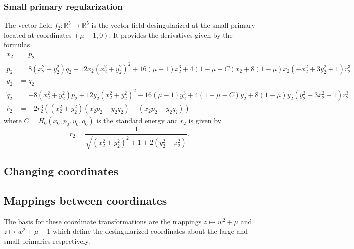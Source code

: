 \documentclass[10pt]{article}
\newcommand{\rr}{\mathbb{R}}
\begin{document}
\subsubsection{Small primary regularization}
The vector field $f_2: \rr^5 \to \rr^5$ is the vector field desingularized at the small primary located at coordinates $(\mu-1,0)$. It provides the derivatives given by the formulas
\begin{align*} 
\dot x_2 & = p_2 \\ 
\dot p_2 & = 8 \left( x_2^2 + y_2^2 \right) q_2 + 12 x_2 \left( x_2^2 + y_2^2  \right)^2 + 16(\mu-1) x_2^3 + 4 ( 1-\mu - C) x_2 + 8 ( 1 - \mu ) x_2 \left( - x_2^2+ 3y_2^2 + 1 \right) r_2^3 \\
\dot y_2 & = q_2 \\ 
\dot q_2 & = - 8 \left( x_2^2 + y_2^2 \right) p_2 + 12 y_2 \left( x_2^2 + y_2^2 \right)^2 - 16 (\mu-1 ) y_2^3 + 4 ( 1-\mu-C ) y_2 + 8 ( 1 - \mu )y_2 \left( y_2^2 - 3 x_2^2 + 1 \right)r_2^3\\
\dot{r_2}  & =  - 2 r_2^3 \left( \left( x_2^2 + y_2^2\right) ( x_2 p_2 + y_2 q_2 ) - ( x_2 p_2 - y_2 q_2 ) \right) 
\end{align*}
where $C = H_0(x_0,p_0,y_0,q_0)$ is the standard energy and $r_2$ is given by 
\[
r_2 = \frac{1}{\sqrt{(x_2^2 + y_2^2)^2 + 1 + 2(y_2^2 - x_2^2)}}.
\]


\subsection{Changing coordinates}

\subsection{Mappings between coordinates}
The basis for these coordinate transformations are the mappings $z \mapsto w^2 + \mu$ and $z \mapsto w^2 + \mu - 1$ which define the desingularized coordinates about the large and small primaries respectively. 
\end{document}
